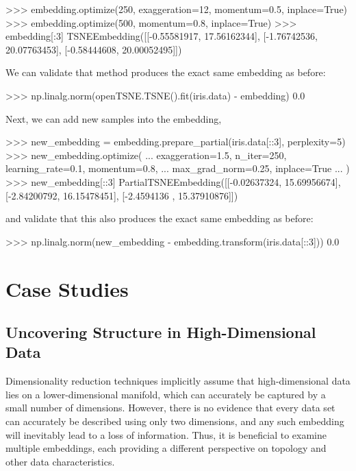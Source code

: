 \documentclass[article]{jss}
\begin{document}
\begin{CodeChunk}
\begin{CodeInput}
>>> embedding.optimize(250, exaggeration=12, momentum=0.5, inplace=True)
>>> embedding.optimize(500, momentum=0.8, inplace=True)
>>> embedding[:3]
TSNEEmbedding([[-0.55581917, 17.56162344],
               [-1.76742536, 20.07763453],
               [-0.58444608, 20.00052495]])
\end{CodeInput}
\end{CodeChunk}
We can validate that method produces the exact same embedding as before:
\begin{CodeChunk}
\begin{CodeInput}
>>> np.linalg.norm(openTSNE.TSNE().fit(iris.data) - embedding)
0.0
\end{CodeInput}
\end{CodeChunk}
Next, we can add new samples into the embedding,
\begin{CodeChunk}
\begin{CodeInput}
>>> new_embedding = embedding.prepare_partial(iris.data[::3], perplexity=5)
>>> new_embedding.optimize(
...     exaggeration=1.5, n_iter=250, learning_rate=0.1, momentum=0.8,
...     max_grad_norm=0.25, inplace=True
... )
>>> new_embedding[::3]
PartialTSNEEmbedding([[-0.02637324, 15.69956674],
                      [-2.84200792, 16.15478451],
                      [-2.4594136 , 15.37910876]])
\end{CodeInput}
\end{CodeChunk}
and validate that this also produces the exact same embedding as before:
\begin{CodeChunk}
\begin{CodeInput}
>>> np.linalg.norm(new_embedding - embedding.transform(iris.data[::3]))
0.0
\end{CodeInput}
\end{CodeChunk}

\section{Case Studies} \label{sec:discussion}

\subsection{Uncovering Structure in High-Dimensional Data}

Dimensionality reduction techniques implicitly assume that high-dimensional data lies on a lower-dimensional manifold, which can accurately be captured by a small number of dimensions. However, there is no evidence that every data set can accurately be described using only two dimensions, and any such embedding will inevitably lead to a loss of information. Thus, it is beneficial to examine multiple embeddings, each providing a different perspective on topology and other data characteristics.
\end{document}
